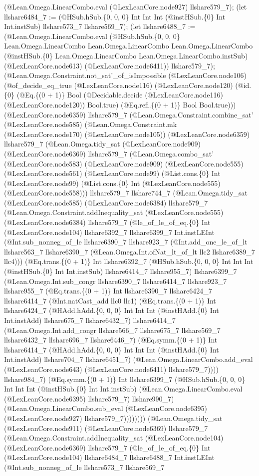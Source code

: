 \documentclass[11pt]{article}
\begin{document}
(@Lean.Omega.LinearCombo.eval (@LexLeanCore.node927) llshare579\_7); (let llshare6484\_7 := (@HSub.hSub.\{0, 0, 0\} Int Int Int (@instHSub.\{0\} Int Int.instSub) llshare573\_7 llshare569\_7); (let llshare6488\_7 := (@Lean.Omega.LinearCombo.eval (@HSub.hSub.\{0, 0, 0\} Lean.Omega.LinearCombo Lean.Omega.LinearCombo Lean.Omega.LinearCombo (@instHSub.\{0\} Lean.Omega.LinearCombo Lean.Omega.LinearCombo.instSub) (@LexLeanCore.node613) (@LexLeanCore.node6411)) llshare579\_7); (@Lean.Omega.Constraint.not\_sat'\_of\_isImpossible (@LexLeanCore.node106) (@of\_decide\_eq\_true (@LexLeanCore.node116) (@LexLeanCore.node120) (@id.\{0\} (@Eq.\{(0 + 1)\} Bool (@Decidable.decide (@LexLeanCore.node116) (@LexLeanCore.node120)) Bool.true) (@Eq.refl.\{(0 + 1)\} Bool Bool.true))) (@LexLeanCore.node6359) llshare579\_7 (@Lean.Omega.Constraint.combine\_sat' (@LexLeanCore.node585) (@Lean.Omega.Constraint.mk (@LexLeanCore.node170) (@LexLeanCore.node105)) (@LexLeanCore.node6359) llshare579\_7 (@Lean.Omega.tidy\_sat (@LexLeanCore.node909) (@LexLeanCore.node6369) llshare579\_7 (@Lean.Omega.combo\_sat' (@LexLeanCore.node583) (@LexLeanCore.node909) (@LexLeanCore.node555) (@LexLeanCore.node561) (@LexLeanCore.node99) (@List.cons.\{0\} Int (@LexLeanCore.node99) (@List.cons.\{0\} Int (@LexLeanCore.node555) (@LexLeanCore.node558))) llshare579\_7 llshare744\_7 (@Lean.Omega.tidy\_sat (@LexLeanCore.node585) (@LexLeanCore.node6384) llshare579\_7 (@Lean.Omega.Constraint.addInequality\_sat (@LexLeanCore.node555) (@LexLeanCore.node6384) llshare579\_7 (@le\_of\_le\_of\_eq.\{0\} Int (@LexLeanCore.node104) llshare6392\_7 llshare6399\_7 Int.instLEInt (@Int.sub\_nonneg\_of\_le llshare6390\_7 llshare923\_7 (@Int.add\_one\_le\_of\_lt llshare563\_7 llshare6390\_7 (@Lean.Omega.Int.ofNat\_lt\_of\_lt llc2 llshare6389\_7 llc4))) (@Eq.trans.\{(0 + 1)\} Int llshare6392\_7 (@HSub.hSub.\{0, 0, 0\} Int Int Int (@instHSub.\{0\} Int Int.instSub) llshare6414\_7 llshare955\_7) llshare6399\_7 (@Lean.Omega.Int.sub\_congr llshare6390\_7 llshare6414\_7 llshare923\_7 llshare955\_7 (@Eq.trans.\{(0 + 1)\} Int llshare6390\_7 llshare6424\_7 llshare6414\_7 (@Int.natCast\_add llc0 llc1) (@Eq.trans.\{(0 + 1)\} Int llshare6424\_7 (@HAdd.hAdd.\{0, 0, 0\} Int Int Int (@instHAdd.\{0\} Int Int.instAdd) llshare675\_7 llshare6432\_7) llshare6414\_7 (@Lean.Omega.Int.add\_congr llshare566\_7 llshare675\_7 llshare569\_7 llshare6432\_7 llshare696\_7 llshare6446\_7) (@Eq.symm.\{(0 + 1)\} Int llshare6414\_7 (@HAdd.hAdd.\{0, 0, 0\} Int Int Int (@instHAdd.\{0\} Int Int.instAdd) llshare704\_7 llshare6451\_7) (@Lean.Omega.LinearCombo.add\_eval (@LexLeanCore.node643) (@LexLeanCore.node6411) llshare579\_7)))) llshare984\_7) (@Eq.symm.\{(0 + 1)\} Int llshare6399\_7 (@HSub.hSub.\{0, 0, 0\} Int Int Int (@instHSub.\{0\} Int Int.instSub) (@Lean.Omega.LinearCombo.eval (@LexLeanCore.node6395) llshare579\_7) llshare990\_7) (@Lean.Omega.LinearCombo.sub\_eval (@LexLeanCore.node6395) (@LexLeanCore.node927) llshare579\_7)))))))) (@Lean.Omega.tidy\_sat (@LexLeanCore.node911) (@LexLeanCore.node6369) llshare579\_7 (@Lean.Omega.Constraint.addInequality\_sat (@LexLeanCore.node104) (@LexLeanCore.node6369) llshare579\_7 (@le\_of\_le\_of\_eq.\{0\} Int (@LexLeanCore.node104) llshare6484\_7 llshare6488\_7 Int.instLEInt (@Int.sub\_nonneg\_of\_le llshare573\_7 llshare569\_7 
\end{document}

